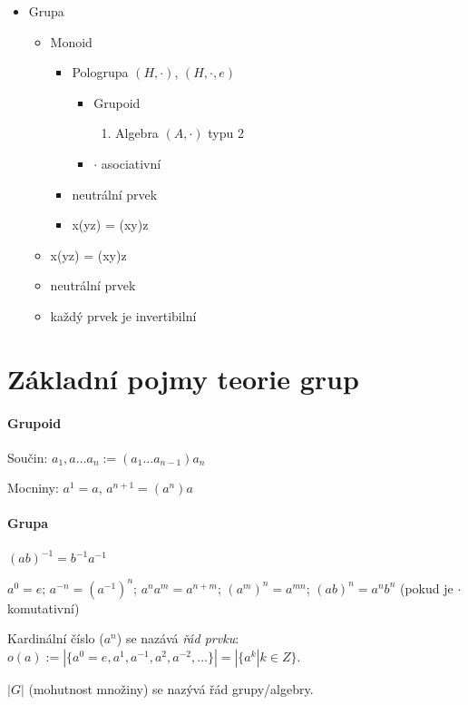 \documentclass[a4paper, 11pt]{report}
\begin{document}
\begin{itemize}
\item Grupa
      \begin{itemize}
      \item Monoid
       \begin{itemize}
       \item Pologrupa $(H, \cdot)$, $(H, \cdot, e)$
        \begin{itemize}
        \item Grupoid
         \begin{enumerate}
		 \item Algebra $(A, \cdot)$ typu 2
		 \end{enumerate}
        \item $\cdot$ asociativní
        \end{itemize}
       \item neutrální prvek
       \item x(yz) = (xy)z
       \end{itemize}
      \item x(yz) = (xy)z
      \item neutrální prvek
      \item každý prvek je invertibilní
      \end{itemize}
\end{itemize}

\section{Základní pojmy teorie grup}

\paragraph{Grupoid}
Součin: $a_1, a \dots a_n := (a_1 \dots a_{n-1})a_n$

Mocniny: $a^1 = a$, $a^{n+1} = (a^n)a$

\paragraph{Grupa}
$(ab)^{-1} = b^{-1}a^{-1}$

$a^0 = e$;
$a^{-n} = (a^{-1})^n$;
$a^n a^m = a^{n+m}$;
$(a^m)^n = a^{mn}$;
$(a b)^n = a^n b^n$ (pokud je $\cdot$ komutativní)

Kardinální číslo ($a^n$) se nazává \emph{řád prvku}: $o(a) := |\{a^0 = e, a^1, a^{-1}, a^2, a^{-2}, \dots\}| = |\{ a^k | k \in Z\}$.

$|G|$ (mohutnost množiny) se nazývá řád grupy/algebry.
\end{document}
